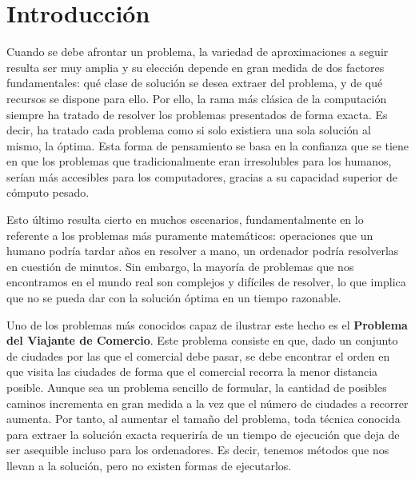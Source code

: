 \chapter{Introducción}

Cuando se debe afrontar un problema, la variedad de aproximaciones a seguir resulta ser muy amplia y su elección depende en gran medida de dos factores fundamentales: qué clase de solución se desea extraer del problema, y de qué recursos se dispone para ello. 
Por ello, la rama más clásica de la computación siempre ha tratado de resolver los problemas presentados de forma exacta. 
Es decir, ha tratado cada problema como si solo existiera una sola solución al mismo, la óptima. 
Esta forma de pensamiento se basa en la confianza que se tiene en que los problemas que tradicionalmente eran irresolubles para los humanos, serían más accesibles para los computadores, gracias a su capacidad superior de cómputo pesado.

Esto último resulta cierto en muchos escenarios, fundamentalmente en lo referente a los problemas más puramente matemáticos: operaciones que un humano podría tardar años en resolver a mano, un ordenador podría resolverlas en cuestión de minutos. 
Sin embargo, la mayoría de problemas que nos encontramos en el mundo real son complejos y difíciles de resolver, lo que implica que no se pueda dar con la solución óptima en un tiempo razonable. 

Uno de los problemas más conocidos capaz de ilustrar este hecho es el \textbf{Problema del Viajante de Comercio}. 
Este problema consiste en que, dado un conjunto de ciudades por las que el comercial debe pasar, se debe encontrar el orden en que visita las ciudades de forma que el comercial recorra la menor distancia posible. 
Aunque sea un problema sencillo de formular, la cantidad de posibles caminos incrementa en gran medida a la vez que el número de ciudades a recorrer aumenta. 
Por tanto, al aumentar el tamaño del problema, toda técnica conocida para extraer la solución exacta requeriría de un tiempo de ejecución que deja de ser asequible incluso para los ordenadores. 
Es decir, tenemos métodos que nos llevan a la solución, pero no existen formas de ejecutarlos. 

